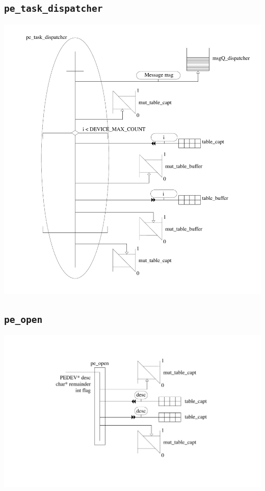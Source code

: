 \documentclass[11pt, a4paper]{article}
\newcommand{\kw}[1]{\texttt{#1}}
\begin{document}
\subsection{\kw{pe\_task\_dispatcher}}
\includegraphics[width=\textwidth]{ressources/pe_task_dispatcher.pdf}
\subsection{\kw{pe\_open}}
\includegraphics[width=\textwidth]{ressources/pe_open.pdf}
\end{document}
